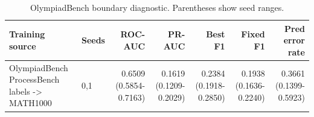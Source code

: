 \begin{table}[t]
\centering
\small
\begin{tabular}{llrrrrr}
\toprule
Training source & Seeds & ROC-AUC & PR-AUC & Best F1 & Fixed F1 & Pred error rate \\
\midrule
OlympiadBench ProcessBench labels -> MATH1000 & 0,1 & 0.6509 (0.5854-0.7163) & 0.1619 (0.1209-0.2029) & 0.2384 (0.1918-0.2850) & 0.1938 (0.1636-0.2240) & 0.3661 (0.1399-0.5923) \\
\bottomrule
\end{tabular}
\caption{OlympiadBench boundary diagnostic. Parentheses show seed ranges.}
\label{tab:phase-b-olympiad-boundary}
\end{table}
